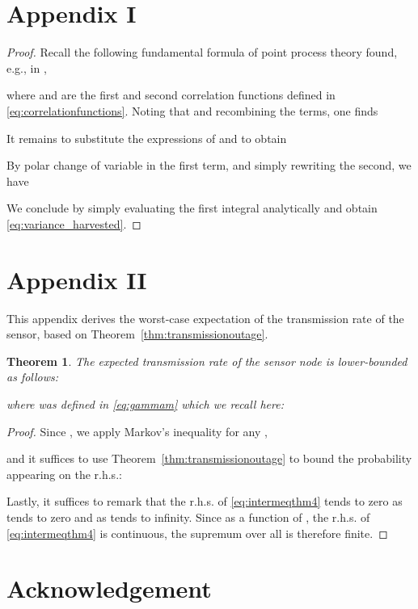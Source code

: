 \documentclass[12pt,draftclsnofoot,onecolumn]{IEEEtran}
\newtheorem{theorem}{Theorem}
\begin{document}
\section*{{\bf Appendix I}}\label{app1}

\begin{proof}
Recall the following fundamental formula of point process theory found, e.g., in \cite{DaleyVereJones},

where  and  are the first and second correlation functions defined in \eqref{eq:correlationfunctions}. Noting that  and recombining the terms, one finds

It remains to substitute the expressions of  and  to obtain

By polar change of variable in the first term, and simply rewriting the second, we have

We conclude by simply evaluating the first integral analytically and obtain \eqref{eq:variance_harvested}.
\end{proof}


\section*{{\bf Appendix II}} \label{app2}
This appendix derives the worst-case expectation of the transmission rate of the sensor, based on Theorem~\ref{thm:transmissionoutage}.

\begin{theorem}
\label{thm:evRi}
The expected transmission rate of the sensor node is lower-bounded as follows:

where  was defined in \eqref{eq:gammam} which we recall here:

\end{theorem}
\begin{proof}
Since , we apply Markov's inequality for any ,

and it suffices to use Theorem~\ref{thm:transmissionoutage} to bound the probability appearing on the r.h.s.:

Lastly, it suffices to remark that the r.h.s. of \eqref{eq:intermeqthm4} tends to zero as  tends to zero and as  tends to infinity. Since as a function of , the r.h.s. of \eqref{eq:intermeqthm4} is continuous, the supremum over all  is therefore finite.
\end{proof}



\section*{Acknowledgement}
\end{document}
